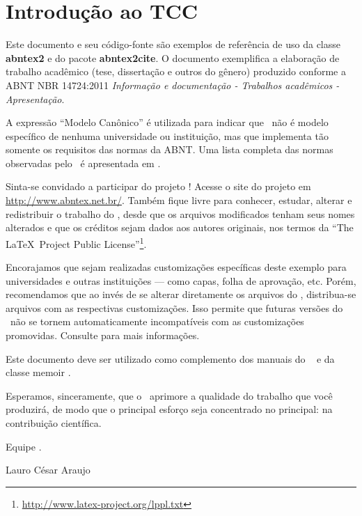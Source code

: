 \chapter{Introdução ao TCC}

Este documento e seu código-fonte são exemplos de referência de uso da classe \textbf{abntex2} e do pacote \textbf{abntex2cite}. O documento exemplifica a elaboração de trabalho acadêmico (tese, dissertação e outros do gênero) produzido conforme a ABNT NBR 14724:2011 \emph{Informação e documentação - Trabalhos acadêmicos - Apresentação}.

A expressão ``Modelo Canônico'' é utilizada para indicar que \abnTeX\ não é modelo específico de nenhuma universidade ou instituição, mas que implementa tão somente os requisitos das normas da ABNT. Uma lista completa das normas observadas pelo \abnTeX\ é apresentada em .

Sinta-se convidado a participar do projeto \abnTeX! Acesse o site do projeto em \url{http://www.abntex.net.br/}. Também fique livre para conhecer, estudar, alterar e redistribuir o trabalho do \abnTeX, desde que os arquivos modificados tenham seus nomes alterados e que os créditos sejam dados aos autores originais, nos termos da ``The \LaTeX\ Project Public License''\footnote{\url{http://www.latex-project.org/lppl.txt}}.

Encorajamos que sejam realizadas customizações específicas deste exemplo para universidades e outras instituições --- como capas, folha de aprovação, etc. Porém, recomendamos que ao invés de se alterar diretamente os arquivos do \abnTeX, distribua-se arquivos com as respectivas customizações. Isso permite que futuras versões do \abnTeX~não se tornem automaticamente incompatíveis com as customizações promovidas. Consulte  para mais informações.

Este documento deve ser utilizado como complemento dos manuais do \abnTeX\ \cite{abntex2classe,abntex2cite,abntex2cite-alf} e da classe \textsf{memoir} \cite{memoir}. 

Esperamos, sinceramente, que o \abnTeX\ aprimore a qualidade do trabalho que você produzirá, de modo que o principal esforço seja concentrado no principal: na contribuição científica. 

Equipe \abnTeX. 

Lauro César Araujo